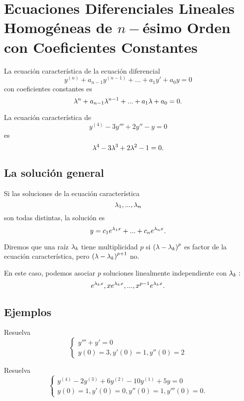 \section{Ecuaciones Diferenciales Lineales Homog\'eneas de $n-$\'esimo Orden con Coeficientes Constantes}


La ecuaci\'on caracter\'istica de la ecuaci\'on diferencial
\[
	\label{bron:10.1}
	y^{(n)}+a_{n-1}y^{(n-1)}+...+a_{1}y'+a_{0}y=0
\]
con coeficientes constantes es
\[
	\label{bron:10.2}
	\lambda^{n}+a_{n-1}\lambda^{n-1}+...+a_{1}\lambda+a_{0}=0.
\]




La ecuaci\'on caracter\'istica de
$$
y^{(4)}-3y'''+2y''-y=0
$$
es
$$
\lambda^{4}-3\lambda^{3}+2\lambda^{2}-1=0.
$$


\subsection{La soluci\'on general}


Si las soluciones de la ecuaci\'on caracter\'istica
$$
\lambda_{1},...,\lambda_{n}
$$ son todas distintas, la soluci\'on es
\[
	\label{bron:10.3}
	y=c_{1}e^{\lambda_{1}x}+...+c_{n}e^{\lambda_{n}x}.
\]




Diremos que una ra\'iz $\lambda_{k}$ tiene multiplicidad $p$ si $\left( \lambda-\lambda_{k} \right)^{p}$ es factor de la ecuaci\'on caracter\'istica, pero $\left( \lambda-\lambda_{k} \right)^{p+1}$ no.

En este caso, podemos asociar $p$ soluciones linealmente independiente con $\lambda_{k}:$
$$
e^{\lambda_{k}x}, xe^{\lambda_{k}x},..., x^{p-1}e^{\lambda_{k}x}.
$$


\subsection{Ejemplos}


\begin{resuelto}
	Resuelva $$\begin{cases}
		y'''+y'=0\\
		y(0)=3, y'(0)=1, y''(0)=2
	\end{cases}
	$$
\end{resuelto}




\begin{resuelto}
	Resuelva
	$$\begin{cases}
		y^{(4)}-2y^{(3)}+6y^{(2)}-10y^{(1)}+5y=0 \\
		y(0)=1, y'(0)=0, y''(0)=1, y'''(0)=0.
	\end{cases}
	$$
\end{resuelto}



